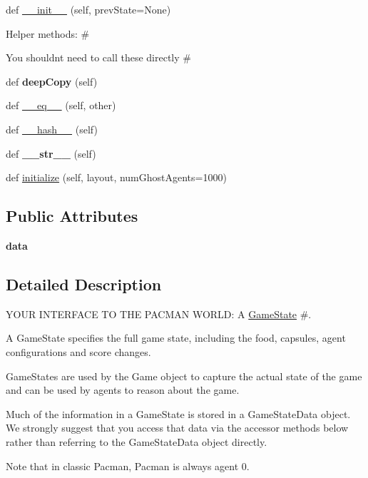 \begin{DoxyCompactItemize}
\item 
def \hyperlink{classpacman_1_1_game_state_ab9cd0448f581a626b6fa2f05a5331ca1}{\+\_\+\+\_\+init\+\_\+\+\_\+} (self, prev\+State=None)
\begin{DoxyCompactList}\small\item\em \begin{DoxyVerb}        Helper methods:               #
\end{DoxyVerb}
 You shouldn\textquotesingle{}t need to call these directly \# \end{DoxyCompactList}\item 
\mbox{\label{classpacman_1_1_game_state_a9444717b02e2809cb1864f540c544350}} 
def {\bfseries deep\+Copy} (self)
\item 
def \hyperlink{classpacman_1_1_game_state_a9a4c4fa4c3744ec2cf1ca3afd232d089}{\+\_\+\+\_\+eq\+\_\+\+\_\+} (self, other)
\item 
def \hyperlink{classpacman_1_1_game_state_a51305408cabe92cebb6282e033a07bca}{\+\_\+\+\_\+hash\+\_\+\+\_\+} (self)
\item 
\mbox{\label{classpacman_1_1_game_state_afa63b5c06afb29b9a0660d85d8333834}} 
def {\bfseries \+\_\+\+\_\+str\+\_\+\+\_\+} (self)
\item 
def \hyperlink{classpacman_1_1_game_state_a4c6d262e61c43f550cc509e584c559f1}{initialize} (self, layout, num\+Ghost\+Agents=1000)
\end{DoxyCompactItemize}
\subsection*{Public Attributes}
\begin{DoxyCompactItemize}
\item 
\mbox{\label{classpacman_1_1_game_state_a3588cad7134271ae1b53dc726535368b}} 
{\bfseries data}
\end{DoxyCompactItemize}


\subsection{Detailed Description}
Y\+O\+UR I\+N\+T\+E\+R\+F\+A\+CE TO T\+HE P\+A\+C\+M\+AN W\+O\+R\+LD\+: A \hyperlink{classpacman_1_1_game_state}{Game\+State} \#. 

\begin{DoxyVerb}A GameState specifies the full game state, including the food, capsules,
agent configurations and score changes.

GameStates are used by the Game object to capture the actual state of the game and
can be used by agents to reason about the game.

Much of the information in a GameState is stored in a GameStateData object.  We
strongly suggest that you access that data via the accessor methods below rather
than referring to the GameStateData object directly.

Note that in classic Pacman, Pacman is always agent 0.
\end{DoxyVerb}
 

